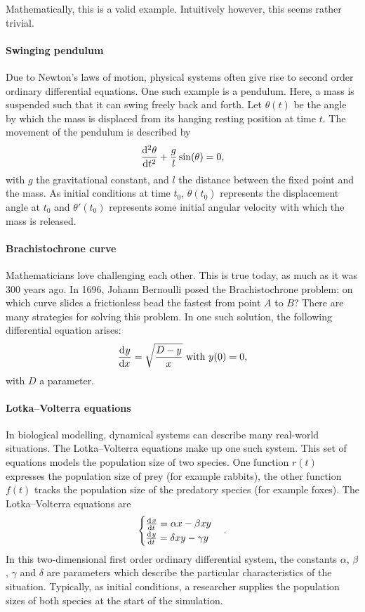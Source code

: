 Mathematically, this is a valid example. Intuitively however, this seems rather trivial.

\paragraph{Swinging pendulum} Due to Newton's laws of motion, physical systems often give rise to second order ordinary differential equations. One such example is a pendulum. Here, a mass is suspended such that it can swing freely back and forth. Let $\theta(t)$ be the angle by which the mass is displaced from its hanging resting position at time $t$. The movement of the pendulum is described by
$$
    \dv[2]{\theta}{t} + \frac{g}{l} \sin(\theta) = 0\text{,}
$$
with $g$ the gravitational constant, and $l$ the distance between the fixed point and the mass. As initial conditions at time $t_0$, $\theta(t_0)$ represents the displacement angle at $t_0$ and $\theta'(t_0)$ represents some initial angular velocity with which the mass is released.

\paragraph{Brachistochrone curve} Mathematicians love challenging each other. This is true today, as much as it was 300 years ago. In 1696, Johann Bernoulli posed the Brachistochrone problem: on which curve slides a frictionless bead the fastest from point $A$ to $B$? There are many strategies for solving this problem. In one such solution, the following differential equation arises:
$$
    {\dv[]{y}{x}} = \sqrt{\frac{D - y}{x}} \text{ with $y(0) = 0$,}
$$
with $D$ a parameter.

\paragraph{Lotka--Volterra equations} In biological modelling, dynamical systems can describe many real-world situations. The Lotka--Volterra equations make up one such system. This set of equations models the population size of two species. One function $r(t)$ expresses the population size of prey (for example rabbits), the other function $f(t)$ tracks the population size of the predatory species (for example foxes). The Lotka--Volterra equations are
$$
    \begin{cases}
        \dv[]{x}{t} = \alpha x - \beta x y  \\
        \dv[]{y}{t} = \delta x y - \gamma y \\
    \end{cases}\text{.}
$$
In this two-dimensional first order ordinary differential system, the constants $\alpha$, $\beta$, $\gamma$ and $\delta$ are parameters which describe the particular characteristics of the situation. Typically, as initial conditions, a researcher supplies the population sizes of both species at the start of the simulation.

